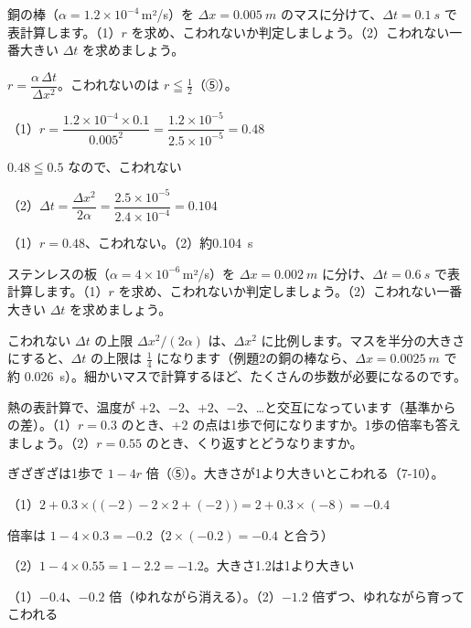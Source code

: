 \begin{reidai}
銅の棒（$\alpha=1.2\times10^{-4}$\,m²/s）を $\Delta x=\qty{0.005}{m}$ のマスに分けて、$\Delta t=\qty{0.1}{s}$ で表計算します。（1）$r$ を求め、こわれないか判定しましょう。（2）こわれない一番大きい $\Delta t$ を求めましょう。\par
\kangaekata $r=\dfrac{\alpha\,\Delta t}{\Delta x^2}$。こわれないのは $r\leqq\frac12$（⑤）。\par
\shiki（1）$r=\dfrac{1.2\times10^{-4}\times0.1}{0.005^2}=\dfrac{1.2\times10^{-5}}{2.5\times10^{-5}}=0.48$\par
\kviiinq $0.48\leqq0.5$ なので、こわれない\par
\kviiinq（2）$\Delta t=\dfrac{\Delta x^2}{2\alpha}=\dfrac{2.5\times10^{-5}}{2.4\times10^{-4}}=0.104$\par
\kotae（1）$r=0.48$、こわれない。（2）約\qty{0.104}{s}
\end{reidai}

\begin{jibun}
ステンレスの板（$\alpha=4\times10^{-6}$\,m²/s）を $\Delta x=\qty{0.002}{m}$ に分け、$\Delta t=\qty{0.6}{s}$ で表計算します。（1）$r$ を求め、こわれないか判定しましょう。（2）こわれない一番大きい $\Delta t$ を求めましょう。
\end{jibun}

こわれない $\Delta t$ の上限 $\Delta x^2/(2\alpha)$ は、$\Delta x^2$ に比例します。マスを半分の大きさにすると、$\Delta t$ の上限は $\frac14$ になります（例題2の銅の棒なら、$\Delta x=\qty{0.0025}{m}$ で約 \qty{0.026}{s}）。細かいマスで計算するほど、たくさんの歩数が必要になるのです。

\begin{reidai}
熱の表計算で、温度が $+2$、$-2$、$+2$、$-2$、…と交互になっています（基準からの差）。（1）$r=0.3$ のとき、$+2$ の点は1歩で何になりますか。1歩の倍率も答えましょう。（2）$r=0.55$ のとき、くり返すとどうなりますか。\par
\kangaekata ぎざぎざは1歩で $1-4r$ 倍（⑤）。大きさが1より大きいとこわれる（7-10）。\par
\shiki（1）$2+0.3\times\bigl((-2)-2\times2+(-2)\bigr)=2+0.3\times(-8)=-0.4$\par
\kviiinq 倍率は $1-4\times0.3=-0.2$（$2\times(-0.2)=-0.4$ と合う）\par
\kviiinq（2）$1-4\times0.55=1-2.2=-1.2$。大きさ1.2は1より大きい\par
\kotae（1）$-0.4$、$-0.2$ 倍（ゆれながら消える）。（2）$-1.2$ 倍ずつ、ゆれながら育ってこわれる
\end{reidai}

